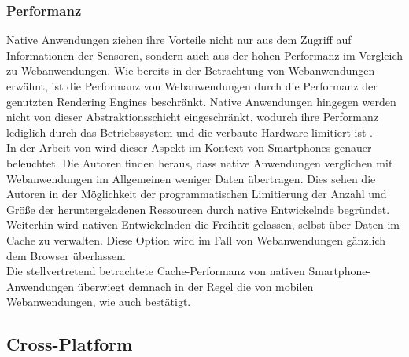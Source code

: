 \documentclass[a4paper]{scrartcl}
\begin{document}
\subsubsection{Performanz}

Native Anwendungen ziehen ihre Vorteile nicht nur aus dem Zugriff auf Informationen der Sensoren, sondern auch aus der hohen Performanz im Vergleich zu Webanwendungen. Wie bereits in der Betrachtung von Webanwendungen erwähnt, ist die Performanz von Webanwendungen durch die Performanz der genutzten Rendering Engines beschränkt. Native Anwendungen hingegen werden nicht von dieser Abstraktionsschicht eingeschränkt, wodurch ihre Performanz lediglich durch das Betriebssystem und die verbaute Hardware limitiert ist \autocite[28]{Jobe}. \\
In der Arbeit von \textcite[999]{native_vs_web} wird dieser Aspekt im Kontext von Smartphones genauer beleuchtet. Die Autoren finden heraus, dass native Anwendungen verglichen mit Webanwendungen im Allgemeinen weniger Daten übertragen. Dies sehen die Autoren in der Möglichkeit der programmatischen Limitierung der Anzahl und Größe der heruntergeladenen Ressourcen durch native Entwickelnde begründet. Weiterhin wird nativen Entwickelnden die Freiheit gelassen, selbst über Daten im Cache zu verwalten. Diese Option wird im Fall von Webanwendungen gänzlich dem Browser überlassen. \\ 
Die stellvertretend betrachtete Cache-Performanz von nativen Smartphone-Anwendungen überwiegt demnach in der Regel die von mobilen Webanwendungen, wie auch \textcite[1]{Beyond_native_apps} bestätigt.

\newpage

\subsection{Cross-Platform}
\end{document}
